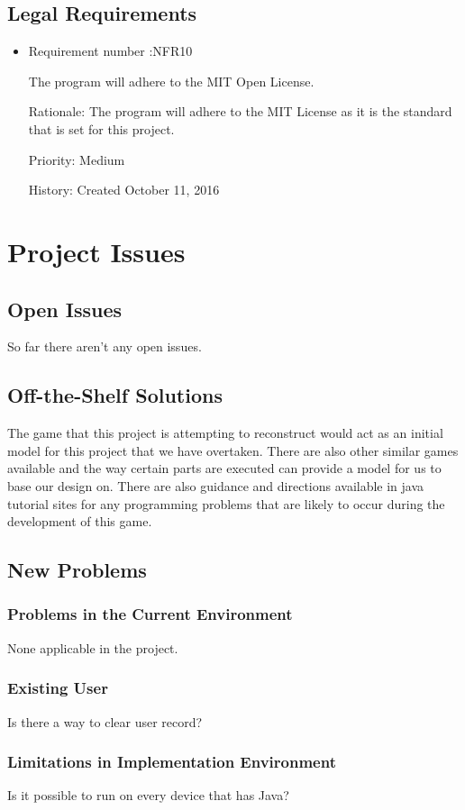\documentclass[12pt,letterpaper]{article}
\begin{document}
\subsection{Legal Requirements}
\begin{itemize}
	\item Requirement number :NFR10   
	
	The program will adhere to the MIT Open License.

	Rationale: The program will adhere to the MIT License as it is the standard that is set for this project.
	
	Priority: Medium   
	
	History: Created October 11, 2016   
\end{itemize}
\section{Project Issues}
\subsection{Open Issues}
So far there aren’t any open issues.
\subsection{Off-the-Shelf Solutions}
The game that this project is attempting to reconstruct would act as an initial model for this project that we have overtaken. There are also other similar games available and the way certain parts are executed can provide a model for us to base our design on. There are also guidance and directions available in java tutorial sites for any programming problems that are likely to occur during the development of this game.  
\subsection{New Problems}
\subsubsection{Problems in the Current Environment}
None applicable in the project.
\subsubsection{Existing User}
Is there a way to clear user record?
\subsubsection{Limitations in Implementation Environment} 
Is it possible to run on every device that has Java?
\end{document}
